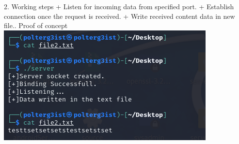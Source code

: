 \documentclass{article}
\begin{document}
2. Working steps\newline 
+ Listen for incoming data from specified port.\newline
+ Establish connection once the request is received.\newline 
+ Write received content data in new file.. Proof of concept
\includegraphics[width=1\linewidth]{server.png}
\end{document}
